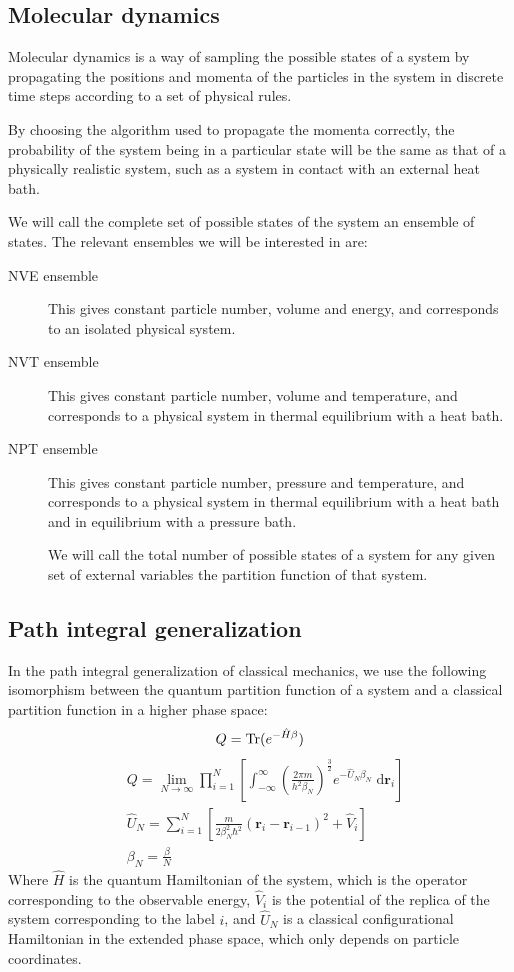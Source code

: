 \documentclass[12pt,fleqn]{report}
\newcommand{\dd}{\; \mathrm{d}}
\newcommand{\Tr}{\mathrm{Tr}}
\newcommand{\betan}{\beta_N}
\begin{document}
\subsection{Molecular dynamics}
Molecular dynamics is a way of sampling the possible states of a system by propagating the positions and momenta of the particles in the system in discrete time steps according to a set of physical rules.

By choosing the algorithm used to propagate the momenta correctly, the probability of the system being in a particular state will be the same as that of a physically realistic system, such as a system in contact with an external heat bath.

We will call the complete set of possible states of the system an ensemble of states. The relevant ensembles we will be interested in are:
\begin{description}
\item[NVE ensemble] This gives constant particle number, volume and energy, and corresponds to an isolated physical system.
\item[NVT ensemble] This gives constant particle number, volume and temperature, and corresponds to a physical system in thermal equilibrium with a heat bath.
\item[NPT ensemble] This gives constant particle number, pressure and temperature, and corresponds to a physical system in thermal equilibrium with a heat bath and in equilibrium with a pressure bath.

We will call the total number of possible states of a system for any given set of external variables the partition function of that system.
\end{description}
\subsection{Path integral generalization}
In the path integral generalization of classical mechanics, we use the following isomorphism between the quantum partition function of a system and a classical partition function in a higher phase space:
\begin{equation}
Q = \Tr (e^{-\hat{H} \beta}) \\
\end{equation}
\begin{align}
&Q = \lim_{N\to \infty} \prod_{i=1}^N \left[ \int_{-\infty}^\infty  
\left( \frac{ 2 \pi m}{h^2 \betan} \right) ^{\frac{3}{2}} 
e^{-\hat{U}_N \betan} \dd \textbf{r}_i \right] \\
& \hat{U}_N=
\sum_{i=1}^N \left[ \frac{m}{2 \betan^2 \hbar^2}(\textbf{r}_i-\textbf{r}_{i-1})^2+\hat{V}_i \right] \\
&\betan = \frac{\beta}{N} \nonumber
\end{align}
Where \(\hat{H}\) is the quantum Hamiltonian of the system, which is the operator corresponding to the observable energy, \(\hat{V}_i\) is the potential of the replica of the system corresponding to the label \(i\), and \(\hat{U}_N\) is a classical configurational Hamiltonian in the extended phase space, which only depends on particle coordinates. 
\end{document}
